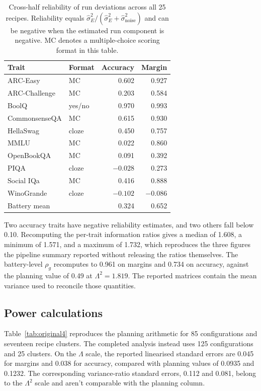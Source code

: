 \begin{table}[!htb]
\centering
\caption{Cross-half reliability of run deviations across all 25 recipes. Reliability equals $\widehat\sigma_E^2/(\widehat\sigma_E^2+\widehat\sigma_{\mathrm{noise}}^2)$ and can be negative when the estimated run component is negative. MC denotes a multiple-choice scoring format in this table.}
\label{tab:original3}
\small\setlength{\tabcolsep}{4pt}\renewcommand{\arraystretch}{1.12}
\begin{tabular}{llrr}\toprule
Trait & Format & Accuracy & Margin\\\midrule
ARC-Easy & MC & 0.602 & 0.927\\
ARC-Challenge & MC & 0.203 & 0.584\\
BoolQ & yes/no & 0.970 & 0.993\\
CommonsenseQA & MC & 0.615 & 0.930\\
HellaSwag & cloze & 0.450 & 0.757\\
MMLU & MC & 0.022 & 0.860\\
OpenBookQA & MC & 0.091 & 0.392\\
PIQA & cloze & $-0.028$ & 0.273\\
Social IQa & MC & 0.416 & 0.888\\
WinoGrande & cloze & $-0.102$ & $-0.086$\\
Battery mean & & 0.324 & 0.652\\\bottomrule
\end{tabular}
\end{table}

Two accuracy traits have negative reliability estimates, and two others fall below 0.10. Recomputing the per-trait information ratios gives a median of 1.608, a minimum of 1.571, and a maximum of 1.732, which reproduces the three figures the pipeline summary reported without releasing the ratios themselves. The battery-level $\rho_g$ recomputes to 0.961 on margins and 0.734 on accuracy, against the planning value of 0.49 at $\Lambda^2=1.819$. The reported matrices contain the mean variance used to reconcile those quantities.

\subsection{Power calculations}
Table~\ref{tab:original4} reproduces the planning arithmetic for 85 configurations and seventeen recipe clusters. The completed analysis instead uses 125 configurations and 25 clusters. On the $\Lambda$ scale, the reported linearised standard errors are 0.045 for margins and 0.038 for accuracy, compared with planning values of 0.0935 and 0.1232. The corresponding variance-ratio standard errors, 0.112 and 0.081, belong to the $\Lambda^2$ scale and aren't comparable with the planning column.

